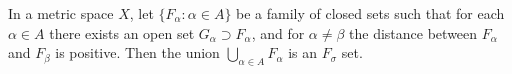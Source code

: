 In a metric space $X$, let $\{F_\alpha : \alpha \in A\}$ be a family of closed sets such that for each $\alpha \in A$ there exists an open set $G_\alpha \supset F_\alpha$, and for $\alpha \neq \beta$ the distance between $F_\alpha$ and $F_\beta$ is positive. Then the union $\bigcup_{\alpha \in A} F_\alpha$ is an $F_\sigma$ set.
